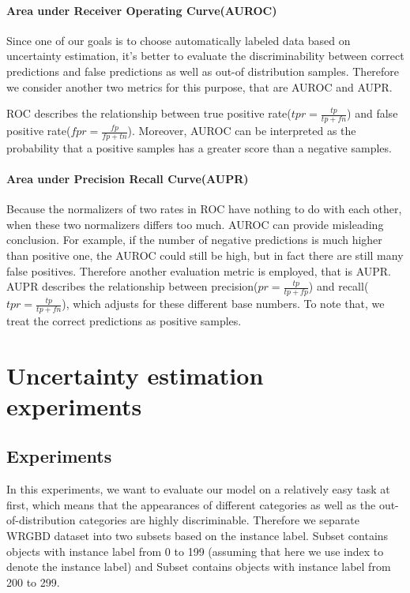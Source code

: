 \paragraph{Area under Receiver Operating Curve(AUROC)} Since one of our goals is to choose automatically labeled data based on uncertainty estimation, it's better to evaluate the discriminability between correct predictions and false predictions as well as out-of distribution samples. Therefore we consider another two metrics for this purpose, that are AUROC and AUPR.

ROC describes the relationship between true positive rate($tpr=\frac{tp}{tp+fn}$) and false positive rate($fpr=\frac{fp}{fp+tn}$). Moreover, AUROC can be interpreted as the probability that a positive samples has a greater score than a negative samples.

\paragraph{Area under Precision Recall Curve(AUPR)} Because the normalizers of two rates in ROC have nothing to do with each other, when these two normalizers differs too much. AUROC can provide misleading conclusion. For example, if the number of negative predictions is much higher than positive one, the AUROC could still be high, but in fact there are still many false positives. Therefore another evaluation metric is employed, that is AUPR. AUPR describes the relationship between precision($pr = \frac{tp}{tp+fp}$) and recall($tpr=\frac{tp}{tp+fn}$), which adjusts for these different base numbers. To note that, we treat the correct predictions as positive samples.

\section{Uncertainty estimation experiments}

\subsection{Experiments }
In this experiments, we want to evaluate our model on a relatively easy task at first, which means that the appearances of different categories as well as the out-of-distribution categories are highly discriminable. Therefore we separate WRGBD dataset into two subsets based on the instance label. Subset  contains objects with instance label from 0 to 199 (assuming that here we use index to denote the instance label) and Subset  contains objects with instance label from 200 to 299. 

